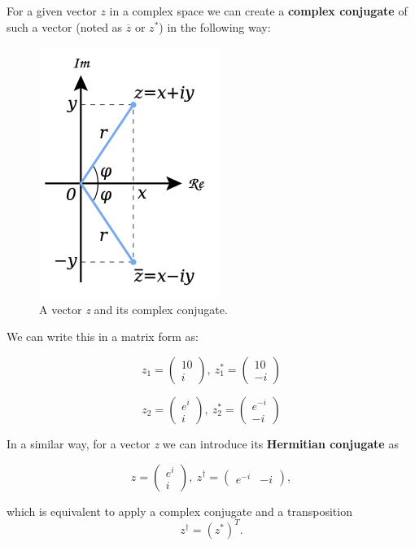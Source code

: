 \begin{example}
For a given vector $z$ in a complex space we can create a \textbf{complex conjugate} of such a vector (noted as $\overline{z}$ or $z^*$) in the following way:

\begin{figure}[ht]
\centering
\includegraphics[scale=0.5]{complex_conjugate}
\caption{A vector \textit{z} and its complex conjugate.}
\end{figure}

We can write this in a matrix form as:

\[ z_1 = \begin{pmatrix} 10 \\ i \end{pmatrix}, \ z_{1}^* = \begin{pmatrix} 10 \\ -i \end{pmatrix}  \]

\[ z_2 = \begin{pmatrix} e^{i} \\ i \end{pmatrix}, \ z_{2}^* = \begin{pmatrix} e^{-i} \\ -i \end{pmatrix}  \]
\end{example}

\begin{example}
In a similar way, for a vector \textit{z} we can introduce its \textbf{Hermitian conjugate} as

\[ z = \begin{pmatrix} e^{i} \\ i \end{pmatrix}, \ z^{\dagger} = \begin{pmatrix} e^{-i} & -i \end{pmatrix}, \]

which is equivalent to apply a complex conjugate and a transposition
\[  z^\dagger = (z^*)^T. \]
\end{example}

